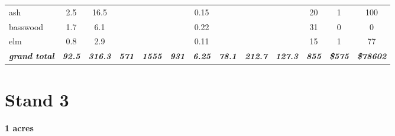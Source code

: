 \documentclass[landscape]{article}
\begin{document}
\begin{table}[H]
\begin{tabular}[t]{lcccccccccccc}
ash & 2.5 & 16.5 &  &  &  & 0.15 &  &  &  & 20 & 1 & 100\\
 
\rowcolor{gray!6}  basswood & 1.7 & 6.1 &  &  &  & 0.22 &  &  &  & 31 & 0 & 0\\
 
elm & 0.8 & 2.9 &  &  &  & 0.11 &  &  &  & 15 & 1 & 77\\
 
\rowcolor{gray!6}  \rowcolor[HTML]{DCDCDC}  \em{\textbf{grand total}} & \em{\textbf{92.5}} & \em{\textbf{316.3}} & \em{\textbf{571}} & \em{\textbf{1555}} & \em{\textbf{931}} & \em{\textbf{6.25}} & \em{\textbf{78.1}} & \em{\textbf{212.7}} & \em{\textbf{127.3}} & \em{\textbf{855}} & \em{\textbf{\$575}} & \em{\textbf{\$78602}}\\
\bottomrule
\end{tabular}
\end{table}

\pagebreak

\section{Stand 3}\label{stand-3}

\textbf{1 acres}
\end{document}
